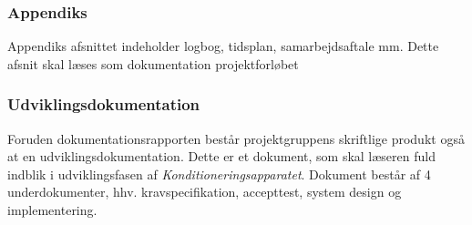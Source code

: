 \subsubsection{Appendiks}
Appendiks afsnittet indeholder logbog, tidsplan, samarbejdsaftale mm. Dette afsnit skal læses som dokumentation projektforløbet

\subsubsection{Udviklingsdokumentation}
Foruden dokumentationsrapporten består projektgruppens skriftlige produkt også at en udviklingsdokumentation. Dette er et dokument, som skal læseren fuld indblik i udviklingsfasen af \textit{Konditioneringsapparatet}. Dokument består af 4 underdokumenter, hhv. kravspecifikation, accepttest, system design og implementering. 



